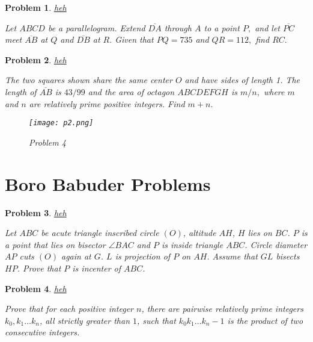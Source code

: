\documentclass[12pt]{article}
\newtheorem{problem}{Problem}
\begin{document}
	
	\bigskip
	
	
	\begin{problem}
		\href{https://artofproblemsolving.com/wiki/index.php/1998_AIME_Problems/Problem_6}{heh}
		
		Let $ABCD$ be a parallelogram. Extend $\overline{DA}$ through $A$ to a point $P,$ and let $\overline{PC}$ meet $\overline{AB}$ at $Q$ and $\overline{DB}$ at $R.$ Given that $PQ=735$ and $QR=112,$ find $RC.$
	\end{problem}
	
	\bigskip
	
	
	\begin{problem}
		\href{https://artofproblemsolving.com/wiki/index.php/1999_AIME_Problems/Problem_4}{heh}
		
		The two squares shown share the same center $O$ and have sides of length 1. The length of $\overline{AB}$ is $43/99$ and the area of octagon $ABCDEFGH$ is $m/n,$ where $m$ and $n$ are relatively prime positive integers. Find $m+n.$
		
		\begin{figure}[H] 
			\centering 
			\texttt{[image: p2.png]} 
			\caption{Problem 4} 
		\end{figure}
	\end{problem}
	
	
	
	
	
	\newpage\section{Boro Babuder Problems}
	
	
	
	\bigskip
	
	\begin{problem}
		\href{https://artofproblemsolving.com/wiki/index.php/2008_USAMO_Problems/Problem_2}{heh}
		
		Let $ABC$ be acute triangle inscribed circle $(O)$, altitude $AH$, $H$ lies on $BC$. $P$ is a point that lies on bisector $\angle BAC$ and $P$ is inside triangle $ABC$. Circle diameter $AP$ cuts $(O)$ again at $G$. $L$ is projection of $P$ on $AH$. Assume that $GL$ bisects $HP$. Prove that $P$ is incenter of $ABC$.
	\end{problem}
	
	\bigskip
	
	
	\begin{problem}
		\href{https://artofproblemsolving.com/wiki/index.php/2008_USAMO_Problems/Problem_1}{heh}
		
		Prove that for each positive integer $n$, there are pairwise relatively prime integers $k_0, k_1\dots k_n$, all strictly greater than $1$, such that $k_0k_1\dots k_n-1$ is the product of two consecutive integers.
	\end{problem}
	
\end{document}
